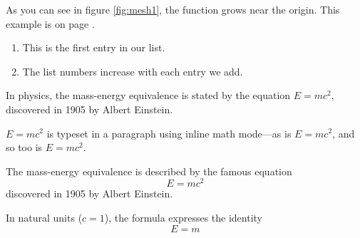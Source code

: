 \documentclass[12pt, letterpaper]{article}
\begin{document}
As you can see in figure \ref{fig:mesh1}, the function grows near the origin. This example is on page \pageref{fig:mesh1}.

\begin{enumerate}
    \item This is the first entry in our list.
    \item The list numbers increase with each entry we add.
\end{enumerate}

In physics, the mass-energy equivalence is stated 
by the equation $E=mc^2$, discovered in 1905 by Albert Einstein.

\begin{math}
    E=mc^2
\end{math} is typeset in a paragraph using inline math mode---as is $E=mc^2$, and so too is \(E=mc^2\).

The mass-energy equivalence is described by the famous equation
\[ E=mc^2 \] discovered in 1905 by Albert Einstein. 

In natural units ($c = 1$), the formula expresses the identity
\begin{equation}
E=m
\end{equation}
\end{document}
